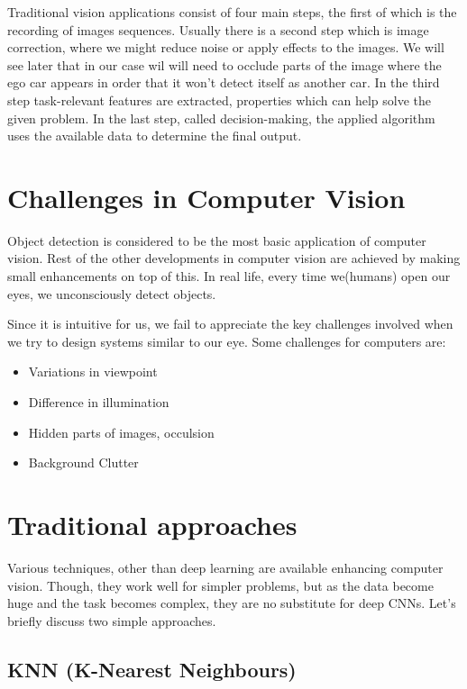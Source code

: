 Traditional vision applications consist of four main steps, the first of which
is the recording of images sequences. Usually there is a second step which is
image correction, where we might reduce noise or apply effects to the images. We
will see later that in our case wil will need to occlude parts of the image
where the ego car appears in order that it won't detect itself as another car.
In the third step task-relevant features are extracted, properties which can
help solve the given problem. In the last step, called decision-making, the
applied algorithm uses the available data to determine the final output.

\section{Challenges in Computer Vision}
Object detection is considered to be the most basic application of computer
vision. Rest of the other developments in computer vision are achieved by making
small enhancements on top of this. In real life, every time we(humans) open our
eyes, we unconsciously detect objects.

Since it is intuitive for us, we fail to appreciate the key challenges involved
when we try to design systems similar to our eye. Some challenges for computers are:

\begin{itemize}
    \item Variations in viewpoint
    \item Difference in illumination
    \item Hidden parts of images, occulsion
    \item Background Clutter
\end{itemize}

\section{Traditional approaches}

Various techniques, other than deep learning are available enhancing computer
vision. Though, they work well for simpler problems, but as the data become huge
and the task becomes complex, they are no substitute for deep CNNs. Let’s
briefly discuss two simple approaches.

\subsection{KNN (K-Nearest Neighbours)}

